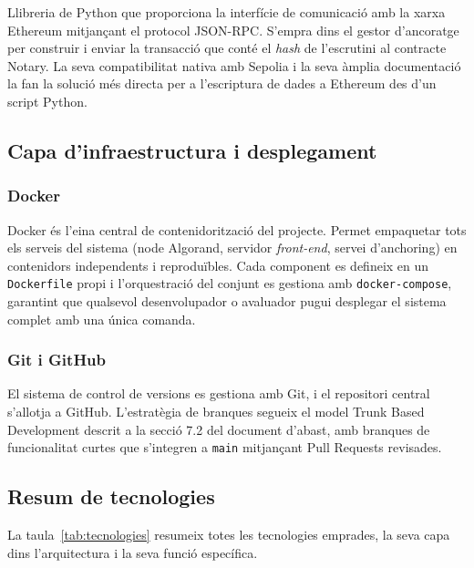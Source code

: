 Llibreria de Python que proporciona la interfície de comunicació amb la xarxa Ethereum mitjançant el protocol JSON-RPC. S'empra dins el gestor d'ancoratge per construir i enviar la transacció que conté el \textit{hash} de l'escrutini al contracte Notary. La seva compatibilitat nativa amb Sepolia i la seva àmplia documentació la fan la solució més directa per a l'escriptura de dades a Ethereum des d'un script Python.
 
\subsection{Capa d'infraestructura i desplegament}
 
\subsubsection{Docker}
 
Docker és l'eina central de contenidorització del projecte. Permet empaquetar tots els serveis del sistema (node Algorand, servidor \textit{front-end}, servei d'anchoring) en contenidors independents i reproduïbles. Cada component es defineix en un \texttt{Dockerfile} propi i l'orquestració del conjunt es gestiona amb \texttt{docker-compose}, garantint que qualsevol desenvolupador o avaluador pugui desplegar el sistema complet amb una única comanda.
 
\subsubsection{Git i GitHub}
 
El sistema de control de versions es gestiona amb Git, i el repositori central s'allotja a GitHub. L'estratègia de branques segueix el model Trunk Based Development descrit a la secció 7.2 del document d'abast, amb branques de funcionalitat curtes que s'integren a \texttt{main} mitjançant Pull Requests revisades.
 
\subsection{Resum de tecnologies}
 
La taula~\ref{tab:tecnologies} resumeix totes les tecnologies emprades, la seva capa dins l'arquitectura i la seva funció específica.
 

